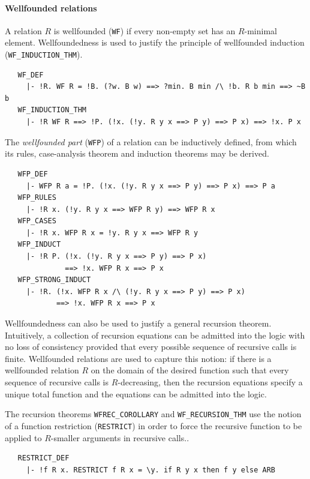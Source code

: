 {\paragraph {Wellfounded relations}

A relation $R$ is wellfounded ({\small\verb+WF+}) if every non-empty set
has an $R$-minimal element. Wellfoundedness is used to justify the
principle of wellfounded induction ({\small\verb+WF_INDUCTION_THM+}).
%
\begin{hol}
\begin{verbatim}
   WF_DEF
     |- !R. WF R = !B. (?w. B w) ==> ?min. B min /\ !b. R b min ==> ~B b
   WF_INDUCTION_THM
     |- !R WF R ==> !P. (!x. (!y. R y x ==> P y) ==> P x) ==> !x. P x
\end{verbatim}
\end{hol}

The \emph{wellfounded part} ({\small\verb+WFP+}) of a relation can be
inductively defined, from which its rules, case-analysis theorem and
induction theorems may be derived.
%
\begin{hol}
\begin{verbatim}
   WFP_DEF
     |- WFP R a = !P. (!x. (!y. R y x ==> P y) ==> P x) ==> P a
   WFP_RULES
     |- !R x. (!y. R y x ==> WFP R y) ==> WFP R x
   WFP_CASES
     |- !R x. WFP R x = !y. R y x ==> WFP R y
   WFP_INDUCT
     |- !R P. (!x. (!y. R y x ==> P y) ==> P x)
              ==> !x. WFP R x ==> P x
   WFP_STRONG_INDUCT
     |- !R. (!x. WFP R x /\ (!y. R y x ==> P y) ==> P x)
            ==> !x. WFP R x ==> P x
\end{verbatim}
\end{hol}

Wellfoundedness can also be used to justify a general recursion
theorem. Intuitively, a collection of recursion equations can be
admitted into the \HOL{} logic with no loss of consistency provided
that every possible sequence of recursive calls is finite. Wellfounded
relations are used to capture this notion: if there is a wellfounded
relation $R$ on the domain of the desired function such that every
sequence of recursive calls is $R$-decreasing, then the recursion
equations specify a unique total function and the equations can be
admitted into the logic.

The recursion theorems {\small\verb+WFREC_COROLLARY+} and
{\small\verb+WF_RECURSION_THM+} use the notion of a function
restriction ({\small\verb+RESTRICT+}) in order to force the recursive
function to be applied to $R$-smaller arguments in recursive calls..
%
\begin{hol}
\begin{verbatim}
   RESTRICT_DEF
     |- !f R x. RESTRICT f R x = \y. if R y x then f y else ARB


\end{verbatim}
\end{hol}}
